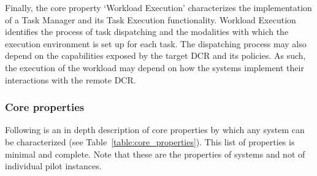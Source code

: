\documentclass{sig-alternate}
\begin{document}
Finally, the core property `Workload Execution' characterizes the implementation
of a Task Manager and its Task Execution functionality. Workload Execution
identifies the process of task dispatching and the modalities with which the
execution environment is set up for each task. The dispatching process may also
depend on the capabilities exposed by the target DCR and its policies. As such,
the execution of the workload may depend on how the \pilot systems implement
their interactions with the remote DCR.



\subsubsection{Core properties}
\label{sec:coreprops}



Following is an in depth description of core properties by which any \pilot
system can be characterized (see Table~\ref{table:core_properties}). This list
of properties is minimal and complete. Note that these are the properties of
\pilot systems and not of individual pilot instances.
\end{document}
